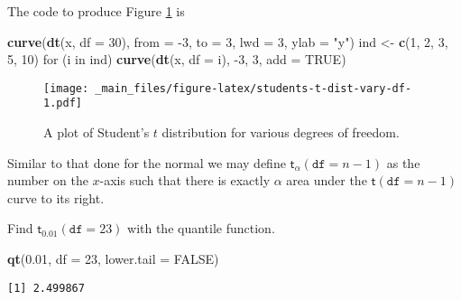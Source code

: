 \documentclass[]{book}
\newenvironment{Shaded}{\begin{snugshade}}{\end{snugshade}}
\newcommand{\KeywordTok}[1]{\textcolor[rgb]{0.13,0.29,0.53}{\textbf{{#1}}}}
\newcommand{\DataTypeTok}[1]{\textcolor[rgb]{0.13,0.29,0.53}{{#1}}}
\newcommand{\DecValTok}[1]{\textcolor[rgb]{0.00,0.00,0.81}{{#1}}}
\newcommand{\FloatTok}[1]{\textcolor[rgb]{0.00,0.00,0.81}{{#1}}}
\newcommand{\StringTok}[1]{\textcolor[rgb]{0.31,0.60,0.02}{{#1}}}
\newcommand{\OtherTok}[1]{\textcolor[rgb]{0.56,0.35,0.01}{{#1}}}
\newcommand{\NormalTok}[1]{{#1}}
\numberwithin{equation}{chapter}
\numberwithin{figure}{chapter}
\theoremstyle{plain}
\theoremstyle{definition}
\theoremstyle{remark}
\theoremstyle{definition}
\theoremstyle{definition}
\theoremstyle{remark}
\let\BeginKnitrBlock\begin \let\EndKnitrBlock\end
\begin{document}
The code to produce Figure \ref{fig:students-t-dist-vary-df} is

\begin{Shaded}
\begin{Highlighting}[]
\KeywordTok{curve}\NormalTok{(}\KeywordTok{dt}\NormalTok{(x, }\DataTypeTok{df =} \DecValTok{30}\NormalTok{), }\DataTypeTok{from =} \NormalTok{-}\DecValTok{3}\NormalTok{, }\DataTypeTok{to =} \DecValTok{3}\NormalTok{, }\DataTypeTok{lwd =} \DecValTok{3}\NormalTok{, }\DataTypeTok{ylab =} \StringTok{"y"}\NormalTok{)}
\NormalTok{ind <-}\StringTok{ }\KeywordTok{c}\NormalTok{(}\DecValTok{1}\NormalTok{, }\DecValTok{2}\NormalTok{, }\DecValTok{3}\NormalTok{, }\DecValTok{5}\NormalTok{, }\DecValTok{10}\NormalTok{)}
\NormalTok{for (i in ind) }\KeywordTok{curve}\NormalTok{(}\KeywordTok{dt}\NormalTok{(x, }\DataTypeTok{df =} \NormalTok{i), -}\DecValTok{3}\NormalTok{, }\DecValTok{3}\NormalTok{, }\DataTypeTok{add =} \OtherTok{TRUE}\NormalTok{)}
\end{Highlighting}
\end{Shaded}

\begin{figure}[htbp]
\centering
\texttt{[image: \_main\_files/figure-latex/students-t-dist-vary-df-1.pdf]}
\caption{\label{fig:students-t-dist-vary-df}\small A plot of Student's \(t\)
distribution for various degrees of freedom.}
\end{figure}




Similar to that done for the normal we may define
\(\mathsf{t}_{\alpha}(\mathtt{df}=n-1)\) as the number on the \(x\)-axis
such that there is exactly \(\alpha\) area under the
\(\mathsf{t}(\mathtt{df}=n-1)\) curve to its right.

\bigskip

\BeginKnitrBlock{example}
\protect\hypertarget{ex:unnamed-chunk-349}{}{\label{ex:unnamed-chunk-349}}Find
\(\mathsf{t}{}_{0.01}(\mathtt{df}=23)\) with the quantile function.
\EndKnitrBlock{example}

\begin{Shaded}
\begin{Highlighting}[]
\KeywordTok{qt}\NormalTok{(}\FloatTok{0.01}\NormalTok{, }\DataTypeTok{df =} \DecValTok{23}\NormalTok{, }\DataTypeTok{lower.tail =} \OtherTok{FALSE}\NormalTok{)}
\end{Highlighting}
\end{Shaded}

\begin{verbatim}
[1] 2.499867
\end{verbatim}
\end{document}
